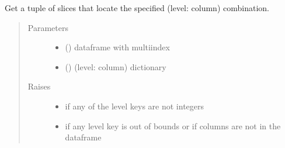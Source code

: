 \documentclass[letterpaper,10pt,english]{sphinxmanual}
\begin{document}
\begin{fulllineitems}
\label{\detokenize{dalio.util:dalio.util.get_slice_from_dict}}
Get a tuple of slices that locate the specified (level: column)
combination.
\begin{quote}\begin{description}
\item[{Parameters}] \leavevmode\begin{itemize}
\item {} 
 () \textendash{} dataframe with multiindex

\item {} 
 () \textendash{} (level: column) dictionary

\end{itemize}

\item[{Raises}] \leavevmode\begin{itemize}
\item {} 
 \textendash{} if any of the level keys are not integers

\item {} 
 \textendash{} if any level key is out of bounds or if columns are not in
    the dataframe

\end{itemize}

\end{description}\end{quote}

\end{fulllineitems}

\end{document}
